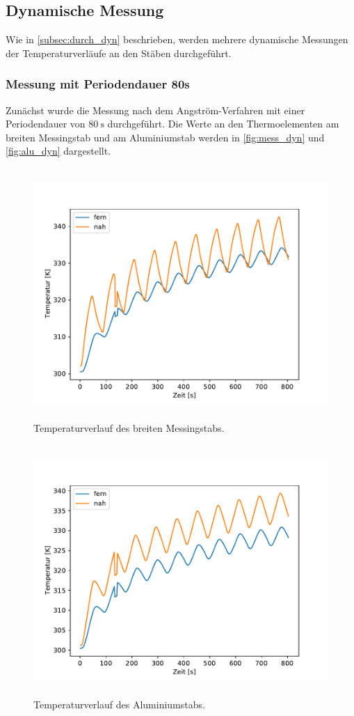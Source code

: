 \subsection{Dynamische Messung}
\label{subsec:aus_dyn}
Wie in \autoref{subsec:durch_dyn} beschrieben, werden mehrere dynamische Messungen der Temperaturverläufe an den Stäben durchgeführt. 


\subsubsection{Messung mit Periodendauer 80s}
\label{subsec:aus_dyn80}

Zunächst wurde die Messung nach dem Angström-Verfahren mit einer Periodendauer von $\qty{80}{\second}$ durchgeführt.
Die Werte an den Thermoelementen am breiten Messingstab und am Aluminiumstab werden in \autoref{fig:mess_dyn} und \autoref{fig:alu_dyn} dargestellt.


\begin{figure}[H]
  \centering
  \includegraphics[height=9.5cm]{content/dyn_80_mess.pdf}
  \caption{Temperaturverlauf des breiten Messingstabs.}
  \label{fig:mess_dyn}
\end{figure}
\begin{figure}[H]
  \centering
  \includegraphics[height=9.5cm]{content/dyn_80_alu.pdf}
  \caption{Temperaturverlauf des Aluminiumstabs.}
  \label{fig:alu_dyn}
\end{figure}

